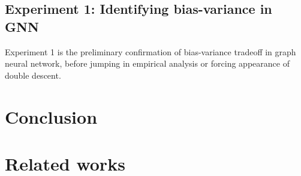 \subsection{Experiment 1: Identifying bias-variance in GNN}
Experiment 1 is the preliminary confirmation of bias-variance tradeoff in graph neural network, before jumping in empirical analysis or forcing appearance of double descent. 



\clearpage
\section{Conclusion}


\section{Related works}
